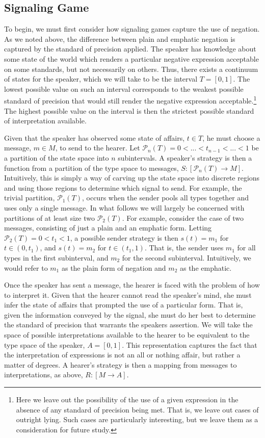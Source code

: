 \documentclass[12pt]{article}
\theoremstyle{definition} \newtheorem{definition}{Definition}
\begin{document}
\subsection{Signaling Game}

To begin, we must first consider how signaling games capture the use of negation. As we noted above, the difference between plain and emphatic negation is captured by the standard of precision applied. The speaker has knowledge about some state of the world which renders a particular negative expression acceptable on some standards, but not necessarily on others. Thus, there exists a continuum of states for the speaker, which we will take to be the interval $T = [0,1]$. The lowest possible value on such an interval corresponds to the weakest possible standard of precision that would still render the negative expression acceptable.\footnote{Here we leave out the possibility of the use of a given expression in the absence of any standard of precision being met. That is, we leave out cases of outright lying. Such cases are particularly interesting, but we leave them as a consideration for future study.} The highest possible value on the interval is then the strictest possible standard of 
interpretation available. 

Given that the speaker has observed some state of affairs, $t \in T$, he must choose a message, $m \in M$, to send to the hearer. Let $\mathcal{P}_n(T)= 0 < ... < t_{n-1} < ... < 1$ be a partition of the state space into $n$ subintervals.  A speaker's strategy is then a function from a partition of the type space to messages, $S : [\mathcal{P}_n(T) \rightarrow M]$. Intuitively, this is simply a way of carving up the state space into discrete regions and using those regions to determine which signal to send. For example, the trivial partition, $\mathcal{P}_1(T)$, occurs when the sender pools all types together and uses only a single message. In what follows we will largely be concerned with partitions of at least size two $\mathcal{P}_2(T)$. For example, consider the case of two messages, consisting of just a plain and an emphatic form. Letting $\mathcal{P}_2(T) = 0 < t_1 < 1$, a possible sender strategy is then  $s(t) = m_1$ for $t \in (0,t_1)$, and $s(t) = m_2$ for $t \in (t_1,1)$. That is, the sender uses 
$m_1$ for all types in the first subinterval, and $m_2$ for the second subinterval. Intuitively, we would refer to $m_1$ as the plain form of negation and $m_2$ as the emphatic.

Once the speaker has sent a message, the hearer is faced with the problem of how to interpret it. Given that the hearer cannot read the speaker's mind, she must infer the state of affairs that prompted the use of a particular form. That is, given the information conveyed by the signal, she must do her best to determine the standard of precision that warrants the speakers assertion. We will take the space of possible interpretations available to the hearer to be equivalent to the type space of the speaker, $A = [0,1]$. This representation captures the fact that the interpretation of expressions is not an all or nothing affair, but rather a matter of degrees.  A hearer's strategy is then a mapping from messages to interpretations, as above, $R : [M \rightarrow A]$.
\end{document}
